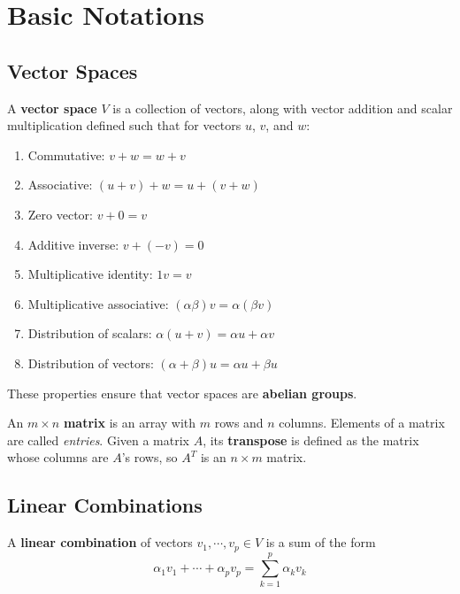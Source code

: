 \chapter{Basic Notations}
\section{Vector Spaces}
\begin{definition}
A \textbf{vector space} $V$ is a collection of vectors, along with vector addition and scalar multiplication defined such that for vectors $u$, $v$, and $w$: 

\begin{enumerate}
	\item Commutative: $v + w = w + v$
	\item Associative: $(u + v) + w = u + (v + w)$
	\item Zero vector: $ v + 0 = v$
	\item Additive inverse: $ v + (-v) = 0$
	\item Multiplicative identity: $ 1v = v$
	\item Multiplicative associative: $ (\alpha \beta)v = \alpha(\beta v)$
	\item Distribution of scalars: $ \alpha(u + v) = \alpha u + \alpha v$
	\item Distribution of vectors: $ (\alpha + \beta)u = \alpha u + \beta u$
\end{enumerate}
\end{definition}

These properties ensure that vector spaces are \textbf{abelian groups}.

\begin{definition}
An $m \times n$ \textbf{matrix} is an array with $m$ rows and $n$ columns. Elements of a matrix are called \textit{entries}. Given a matrix $A$, its \textbf{transpose} is defined as the matrix whose columns are $A$'s rows, so $A^{T}$ is an $n \times m$ matrix. 
\end{definition}

\section{Linear Combinations}
\begin{definition}
A \textbf{linear combination} of vectors $v_{1}, \cdots, v_{p} \in V$ is a sum of the form 
$$\alpha_{1} v_{1} + \cdots + \alpha_{p} v_{p} = \sum_{k = 1}^{p} \alpha_{k} v_{k}$$
\end{definition}

